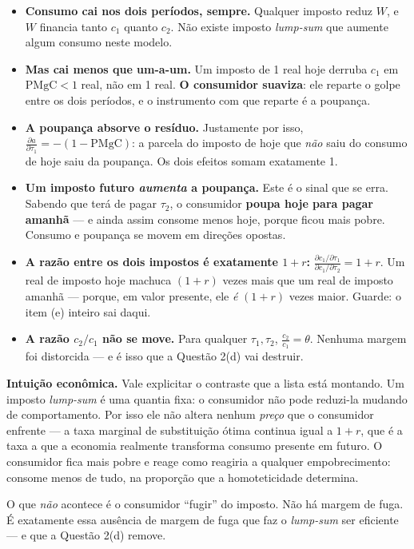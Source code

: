 \documentclass[11pt, a4paper]{article}
\newcommand{\intuicao}[1]{%
  \medskip\noindent\textcolor{midblue}{\textbf{Intuição econômica.}} #1\par}
\begin{document}
\begin{itemize}
\item \textbf{Consumo cai nos dois períodos, sempre.} Qualquer imposto reduz $W$, e $W$
  financia tanto $c_1$ quanto $c_2$. Não existe imposto \emph{lump-sum} que aumente algum
  consumo neste modelo.
\item \textbf{Mas cai menos que um-a-um.} Um imposto de 1 real hoje derruba $c_1$ em
  $\mathrm{PMgC}<1$ real, não em 1 real. \textbf{O consumidor suaviza}: ele reparte o
  golpe entre os dois períodos, e o instrumento com que reparte é a poupança.
\item \textbf{A poupança absorve o resíduo.} Justamente por isso,
  $\frac{\partial a}{\partial\tau_1}=-(1-\mathrm{PMgC})$: a parcela do imposto de hoje que
  \emph{não} saiu do consumo de hoje saiu da poupança. Os dois efeitos somam exatamente 1.
\item \textbf{Um imposto futuro \emph{aumenta} a poupança.} Este é o sinal que se erra.
  Sabendo que terá de pagar $\tau_2$, o consumidor \textbf{poupa hoje para pagar amanhã}
  --- e ainda assim consome menos hoje, porque ficou mais pobre. Consumo e poupança se
  movem em direções opostas.
\item \textbf{A razão entre os dois impostos é exatamente $1+r$:}
  $\frac{\partial c_1/\partial\tau_1}{\partial c_1/\partial\tau_2}=1+r$. Um real de imposto
  hoje machuca $(1+r)$ vezes mais que um real de imposto amanhã --- porque, em valor
  presente, ele \emph{é} $(1+r)$ vezes maior. Guarde: o item (e) inteiro sai daqui.
\item \textbf{A razão $c_2/c_1$ não se move.} Para qualquer $\tau_1,\tau_2$,
  $\frac{c_2}{c_1}=\theta$. Nenhuma margem foi distorcida --- e é isso que a Questão 2(d)
  vai destruir.
\end{itemize}

\intuicao{Vale explicitar o contraste que a lista está montando. Um imposto \emph{lump-sum}
é uma quantia fixa: o consumidor não pode reduzi-la mudando de comportamento. Por isso ele
não altera nenhum \emph{preço} que o consumidor enfrente --- a taxa marginal de substituição
ótima continua igual a $1+r$, que é a taxa a que a economia realmente transforma consumo
presente em futuro. O consumidor fica mais pobre e reage como reagiria a qualquer
empobrecimento: consome menos de tudo, na proporção que a homoteticidade determina.

O que \emph{não} acontece é o consumidor ``fugir'' do imposto. Não há margem de fuga. É
exatamente essa ausência de margem de fuga que faz o \emph{lump-sum} ser eficiente --- e
que a Questão 2(d) remove.}
\end{document}
